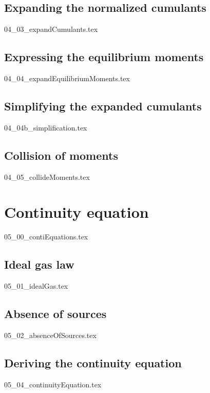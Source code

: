 \documentclass[12pt,a4paper,twoside]{article}
\begin{document}
\subsection{Expanding the normalized cumulants}
\label{sub: Expanding the normalized cumulants}
{04_03_expandCumulants.tex}

\subsection{Expressing the equilibrium moments}
\label{sub: Expressing the equilibrium moments}
{04_04_expandEquilibriumMoments.tex}

\subsection{Simplifying the expanded cumulants}
\label{sub: Simplifying the expanded cumulants}
{04_04b_simplification.tex}

\subsection{Collision of moments}
\label{sub: Collision of moments}
{04_05_collideMoments.tex}

\section{Continuity equation}
\label{sec: Continuity equation}
{05_00_contiEquations.tex}

\subsection{Ideal gas law}
\label{sub: Ideal gas law}
{05_01_idealGas.tex}

\subsection{Absence of sources}
\label{sub: Absence of sources}
{05_02_absenceOfSources.tex}

\subsection{Deriving the continuity equation}
\label{sub: Deriving the continuity equation}
{05_04_continuityEquation.tex}
\end{document}
